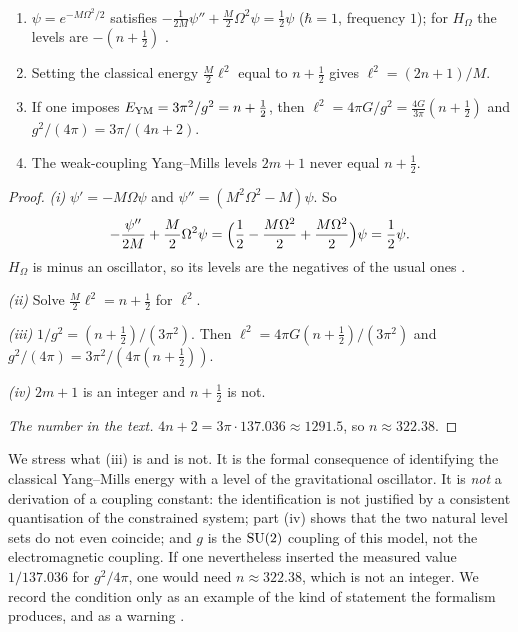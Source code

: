 \begin{proposition}\label{prop:levels}\ver\
\begin{enumerate}[label=(\roman*)]
\item $\psi=e^{-M\Omega^2/2}$ satisfies $-\frac1{2M}\psi''+\frac M2\Omega^2\psi=\frac12\psi$ ($\hbar=1$, frequency $1$); for $H_\Omega$ the levels are $-(n+\frac12)$ \ext.
\item Setting the classical energy $\frac M2\ell^2$ equal to $n+\frac12$ gives $\ell^2=(2n+1)/M$.
\item If one imposes $E_{\rm YM}=3\pi^2/g^2=n+\frac12$, then $\ell^2=4\pi G/g^2=\frac{4G}{3\pi}(n+\frac12)$ and $g^2/(4\pi)=3\pi/(4n+2)$.
\item The weak-coupling Yang--Mills levels $2m+1$ never equal $n+\frac12$.
\end{enumerate}
\end{proposition}
\begin{proof}
\emph{(i)} $\psi'=-M\Omega\psi$ and $\psi''=(M^2\Omega^2-M)\psi$. So
\[
-\frac{\psi''}{2M}+\frac M2\Omega^2\psi=\Bigl(\frac12-\frac{M\Omega^2}2+\frac{M\Omega^2}2\Bigr)\psi=\frac12\psi .
\]
$H_\Omega$ is minus an oscillator, so its levels are the negatives of the usual ones \ext.

\emph{(ii)} Solve $\frac M2\ell^2=n+\frac12$ for $\ell^2$.

\emph{(iii)} $1/g^2=(n+\frac12)/(3\pi^2)$. Then $\ell^2=4\pi G(n+\frac12)/(3\pi^2)$ and $g^2/(4\pi)=3\pi^2/(4\pi(n+\frac12))$.

\emph{(iv)} $2m+1$ is an integer and $n+\frac12$ is not.

\emph{The number in the text.} $4n+2=3\pi\cdot137.036\approx1291.5$, so $n\approx322.38$.
\end{proof}


We stress what (iii) is and is not. It is the formal consequence of identifying the classical Yang--Mills energy with a level of the gravitational oscillator. It is \emph{not} a derivation of a coupling constant: the identification is not justified by a consistent quantisation of the constrained system; part (iv) shows that the two natural level sets do not even coincide; and $g$ is the $\mathrm{SU}(2)$ coupling of this model, not the electromagnetic coupling. If one nevertheless inserted the measured value $1/137.036$ for $g^2/4\pi$, one would need $n\approx322.38$, which is not an integer. We record the condition only as an example of the kind of statement the formalism produces, and as a warning \nogo.

